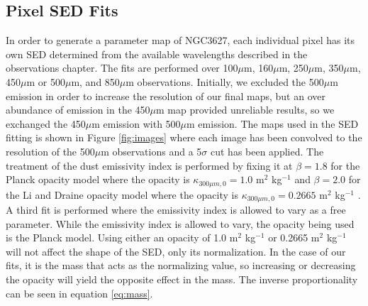 \subsection{Pixel SED Fits}

In order to generate a parameter map of NGC3627, each individual pixel has its own SED determined from the available wavelengths described in the observations chapter.  The fits are performed over 100$\mu$m, 160$\mu$m, 250$\mu$m, 350$\mu$m, 450$\mu$m or 500$\mu$m, and 850$\mu$m observations.  Initially, we excluded the 500$\mu$m emission in order to increase the resolution of our final maps, but an over abundance of emission in the 450$\mu$m map provided unreliable results, so we exchanged the 450$\mu$m emission with 500$\mu$m emission.  The maps used in the SED fitting is shown in Figure \ref{fig:images} where each image has been convolved to the resolution of the 500$\mu$m observations and a 5$\sigma$ cut has been applied.  The treatment of the dust emissivity index is performed by fixing it at $\beta=1.8$ for the Planck opacity model where the opacity is $\kappa_{300\mu m,0}=1.0$ m$^2$ kg$^{-1}$ \citep{planckxxv2011} and $\beta=2.0$ for the Li and Draine opacity model where the opacity is $\kappa_{300\mu m,0}=0.2665$ m$^2$ kg$^{-1}$ \citep{li2001}.  A third fit is performed where the emissivity index is allowed to vary as a free parameter.  While the emissivity index is allowed to vary, the opacity being used is the Planck model.  Using either an opacity of 1.0 m$^2$ kg$^{-1}$ or 0.2665 m$^2$ kg$^{-1}$ will not affect the shape of the SED, only its normalization.  In the case of our fits, it is the mass that acts as the normalizing value, so increasing or decreasing the opacity will yield the opposite effect in the mass.  The inverse proportionality can be seen in equation \ref{eq:mass}.  

